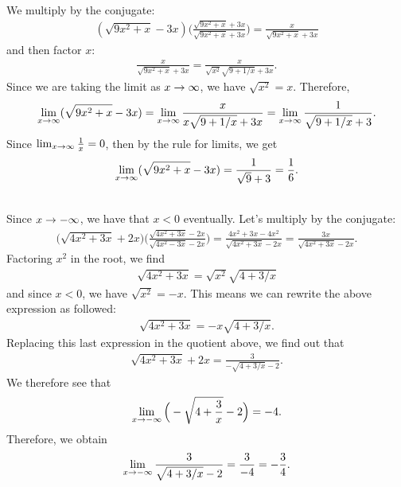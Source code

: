 	\spc
	
	\\
	We multiply by the conjugate:
		\begin{align*}
		(\sqrt{9x^2 + x} - 3x) \Big( \frac{\sqrt{9x^2 + x} + 3x}{\sqrt{9x^2 + x} + 3x} \Big) = \frac{x}{\sqrt{9x^2 + x} + 3x}
		\end{align*}
	and then factor $x$:
		\begin{align*}
		\frac{x}{\sqrt{9x^2 + x} + 3x} = \frac{x}{\sqrt{x^2} \sqrt{9 + 1/x} + 3x} .
		\end{align*}
	Since we are taking the limit as $x \rightarrow \infty$, we have $\sqrt{x^2} = x$. Therefore,
		\begin{align*}
		\lim_{x \rightarrow \infty} (\sqrt{9x^2 + x} - 3x) = \lim_{x \rightarrow \infty} \frac{x}{x \sqrt{9 + 1/x} + 3x} = \lim_{x \rightarrow \infty} \frac{1}{\sqrt{9 + 1/x} + 3} .
		\end{align*}
	Since $\lim_{x \rightarrow \infty} \frac{1}{x} = 0$, then by the rule for limits, we get
		\begin{align*}
		\lim_{x \rightarrow \infty} (\sqrt{9x^2 + x} - 3x) = \frac{1}{\sqrt{9} + 3} = \frac{1}{6} .
		\end{align*}
		
	\spc
	
	\\
	Since $x \rightarrow -\infty$, we have that $x < 0$ eventually. Let's multiply by the conjugate:
		\begin{align*}
		\big( \sqrt{4x^2 + 3x} + 2x \big) \Big( \frac{\sqrt{4x^2 + 3x} - 2x}{\sqrt{4x^2 - 3x} - 2x} \Big) = \frac{4x^2 + 3x - 4x^2}{ \sqrt{4x^2 + 3x} - 2x} = \frac{3x}{\sqrt{4x^2 + 3x} - 2x} .
		\end{align*}
	Factoring $x^2$ in the root, we find
		\begin{align*}
		\sqrt{4x^2 + 3x} = \sqrt{x^2}\sqrt{4 + 3/x} 
		\end{align*}
	and since $x < 0$, we have $\sqrt{x^2} = -x$. This means we can rewrite the above expression as followed:
		\begin{align*}
		\sqrt{4x^2 + 3x} = - x\sqrt{4 + 3/x} .
		\end{align*}
	Replacing this last expression in the quotient above, we find out that
		\begin{align*}
		\sqrt{4x^2 + 3x} + 2x = \frac{3}{-\sqrt{4 + 3/x} - 2} .
		\end{align*}
	We therefore see that
		\begin{align*}
		\lim_{x \rightarrow -\infty} \Big( -\sqrt{4 + \frac{3}{x}} - 2 \Big) = -4 .
		\end{align*}
	Therefore, we obtain
		\begin{align*}
		\lim_{x \rightarrow -\infty} \frac{3}{\sqrt{4 + 3/x} - 2} = \frac{3}{-4} = -\frac{3}{4} .
		\end{align*}
		
